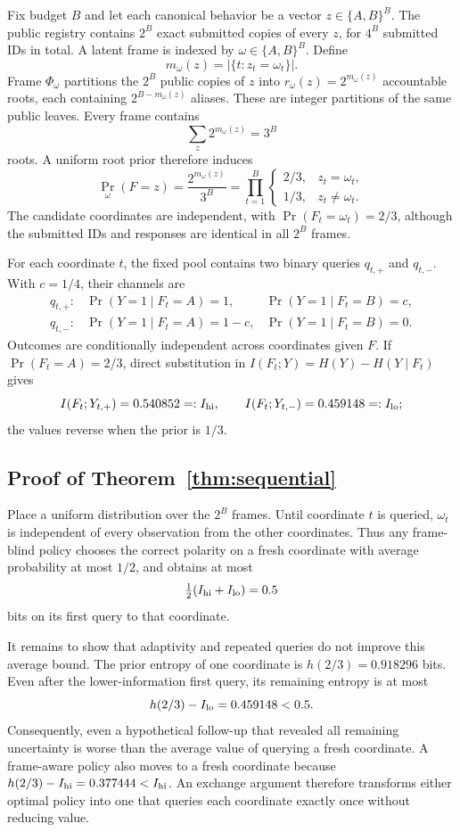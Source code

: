 Fix budget $B$ and let each canonical behavior be a vector $z\in\{A,B\}^B$. The public registry contains $2^B$ exact submitted copies of every $z$, for $4^B$ submitted IDs in total. A latent frame is indexed by $\omega\in\{A,B\}^B$. Define
\[
m_\omega(z)=\left|\{t:z_t=\omega_t\}\right|.
\]
Frame $\Phi_\omega$ partitions the $2^B$ public copies of $z$ into $r_\omega(z)=2^{m_\omega(z)}$ accountable roots, each containing $2^{B-m_\omega(z)}$ aliases. These are integer partitions of the same public leaves. Every frame contains
\[
\sum_z 2^{m_\omega(z)}=3^B
\]
roots. A uniform root prior therefore induces
\[
\Pr_\omega(F=z)=\frac{2^{m_\omega(z)}}{3^B}
=\prod_{t=1}^B
\begin{cases}
2/3,&z_t=\omega_t,\\
1/3,&z_t\neq\omega_t.
\end{cases}
\]
The candidate coordinates are independent, with $\Pr(F_t=\omega_t)=2/3$, although the submitted IDs and responses are identical in all $2^B$ frames.

For each coordinate $t$, the fixed pool contains two binary queries $q_{t,+}$ and $q_{t,-}$. With $c=1/4$, their channels are
\[
\begin{array}{lll}
q_{t,+}:&\Pr(Y=1\mid F_t=A)=1,&\Pr(Y=1\mid F_t=B)=c,\\
q_{t,-}:&\Pr(Y=1\mid F_t=A)=1-c,&\Pr(Y=1\mid F_t=B)=0.
\end{array}
\]
Outcomes are conditionally independent across coordinates given $F$. If $\Pr(F_t=A)=2/3$, direct substitution in $I(F_t;Y)=H(Y)-H(Y\mid F_t)$ gives
\[
I(F_t;Y_{t,+})=0.540852=:I_{\rm hi},\qquad
I(F_t;Y_{t,-})=0.459148=:I_{\rm lo};
\]
the values reverse when the prior is $1/3$.

\subsection{Proof of Theorem~\ref{thm:sequential}}

Place a uniform distribution over the $2^B$ frames. Until coordinate $t$ is queried, $\omega_t$ is independent of every observation from the other coordinates. Thus any frame-blind policy chooses the correct polarity on a fresh coordinate with average probability at most $1/2$, and obtains at most
\[
\tfrac12(I_{\rm hi}+I_{\rm lo})=0.5
\]
bits on its first query to that coordinate.

It remains to show that adaptivity and repeated queries do not improve this average bound. The prior entropy of one coordinate is $h(2/3)=0.918296$ bits. Even after the lower-information first query, its remaining entropy is at most
\[
h(2/3)-I_{\rm lo}=0.459148<0.5.
\]
Consequently, even a hypothetical follow-up that revealed all remaining uncertainty is worse than the average value of querying a fresh coordinate. A frame-aware policy also moves to a fresh coordinate because $h(2/3)-I_{\rm hi}=0.377444<I_{\rm hi}$. An exchange argument therefore transforms either optimal policy into one that queries each coordinate exactly once without reducing value.

